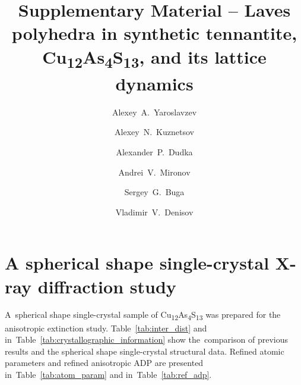 \documentclass[preprint,review,12pt]{elsarticle}
\begin{document}
\begin{frontmatter}



\title{Supplementary Material \--- Laves polyhedra in synthetic tennantite, Cu\textsubscript{12}As\textsubscript{4}S\textsubscript{13}, and its lattice dynamics}

\author[TISNCM]{Alexey~A.~Yaroslavzev}
\author[MSU,ICRAS]{Alexey~N.~Kuznetsov}
\author[SIC]{Alexander~P.~Dudka}
\author[MSU]{Andrei~V.~Mironov}
\author[MIPT,TISNCM]{Sergey~G.~Buga}
\author[TISNCM]{Vladimir~V.~Denisov}

\address[TISNCM]{Technological Institute for Superhard and Novel Carbon Materials, 108840, Troitsk, Moscow, Russia}
\address[MSU]{Department of Chemistry, Lomonosov Moscow State University, 119991, Moscow, Russia}
\address[ICRAS]{Kurnakov Institute of General and Inorganic Chemistry RAS, 119991, Moscow, Russia}
\address[SIC]{Shubnikov Institute of Crystallography of Federal Scientific Research Centre “Crystallography and Photonics” of Russian Academy of Sciences, Leninskiy Prospekt 59, 119333, Moscow, Russia}
\address[MIPT]{Moscow Institute of Physics and Technology, 141700, 9 Institutsky lane, Dolgoprudny, Russia}


\end{frontmatter}


\section{A spherical shape single-crystal X-ray diffraction study}\label{sec:level1}

A~spherical shape single-crystal sample of Cu\textsubscript{12}As\textsubscript{4}S\textsubscript{13}  was prepared for the anisotropic extinction study.
Table~\ref{tab:inter_dist} and in~Table~\ref{tab:crystallographic_information} show the~comparison of previous results\cite{yaroslavzev2019} and the spherical shape single-crystal structural data. Refined atomic parameters and refined anisotropic ADP are presented in~Table~\ref{tab:atom_param} and in~Table~\ref{tab:ref_adp}.
\end{document}
